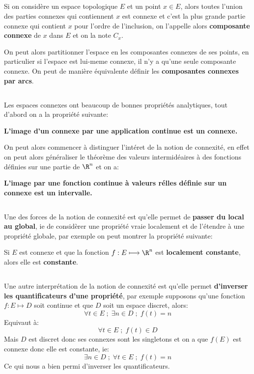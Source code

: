 \subsection*{}
Si on considère un espace topologique \(E\) et un point \(x \in E\), alors toutes l'union des parties connexes qui contiennent \(x\) est connexe et c'est la plus grande partie connexe qui contient \(x\) pour l'ordre de l'inclusion, on l'appelle alors \textbf{composante connexe} de \(x\) dans \(E\) et on la note \(C_x\).\<

On peut alors partitionner l'espace en les composantes connexes de ses points, en particulier si l'espace est lui-meme connexe, il n'y a qu'une seule composante connexe. On peut de manière équivalente définir les \textbf{composantes connexes par arcs}.
\subsection*{}
Les espaces connexes ont beaucoup de bonnes propriétés analytiques, tout d'abord on a la propriété suivante:
\begin{center}
   \textbf{L'image d'un connexe par une application continue est un connexe.}
\end{center}
On peut alors commencer à distinguer l'intéret de la notion de connexité, en effet on peut alors généraliser le théorème des valeurs intermidéaires à des fonctions définies sur une partie de \(\R^n\) et on a:
\begin{center}
   \textbf{L'image par une fonction continue à valeurs rélles définie sur un connexe est un intervalle.}
\end{center}
\subsection*{}
Une des forces de la notion de connexité est qu'elle permet de \textbf{passer du local au global}, ie de considèrer une propriété vraie localement et de l'étendre à une propriété globale, par exemple on peut montrer la propriété suivante:
\begin{center}
   Si \( E \) est connexe et que la fonction \( f : E \longmapsto \R^n \) est \textbf{localement constante}, alors elle est \textbf{constante}.
\end{center}
\subsection*{}
Une autre interprétation de la notion de connexité est qu'elle permet \textbf{d'inverser les quantificateurs d'une propriété}, par exemple supposons qu'une fonction \( f : E \longmapsto D \) soit continue et que \( D \) soit un espace discret, alors:
\[ 
   \forall t \in E \; ; \; \exists n \in D \; ; \; f(t) = n 
\]
Equivaut à:
\[ 
   \forall t \in E \; ; \; f(t) \in D
\]
Mais \( D \) est discret donc ses connexes sont les singletons et on a que \( f(E) \) est connexe donc elle est constante, ie:
\[ 
   \exists n \in D \; ; \; \forall t \in E \; ; \; f(t) = n
\]
Ce qui nous a bien permi d'inverser les quantificateurs.
